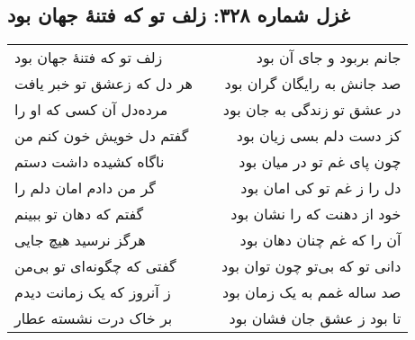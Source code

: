 \begin{center}
\section*{غزل شماره ۳۲۸: زلف تو که فتنهٔ جهان بود}
\label{sec:328}
\begin{longtable}{l p{0.5cm} r}
زلف تو که فتنهٔ جهان بود
&&
جانم بربود و جای آن بود
\\
هر دل که زعشق تو خبر یافت
&&
صد جانش به رایگان گران بود
\\
مرده‌دل آن کسی که او را
&&
در عشق تو زندگی به جان بود
\\
گفتم دل خویش خون کنم من
&&
کز دست دلم بسی زیان بود
\\
ناگاه کشیده داشت دستم
&&
چون پای غم تو در میان بود
\\
گر من دادم امان دلم را
&&
دل را ز غم تو کی امان بود
\\
گفتم که دهان تو ببینم
&&
خود از دهنت که را نشان بود
\\
هرگز نرسید هیچ جایی
&&
آن را که غم چنان دهان بود
\\
گفتی که چگونه‌ای تو بی‌من
&&
دانی تو که بی‌تو چون توان بود
\\
ز آنروز که یک زمانت دیدم
&&
صد ساله غمم به یک زمان بود
\\
بر خاک درت نشسته عطار
&&
تا بود ز عشق جان فشان بود
\\
\end{longtable}
\end{center}
